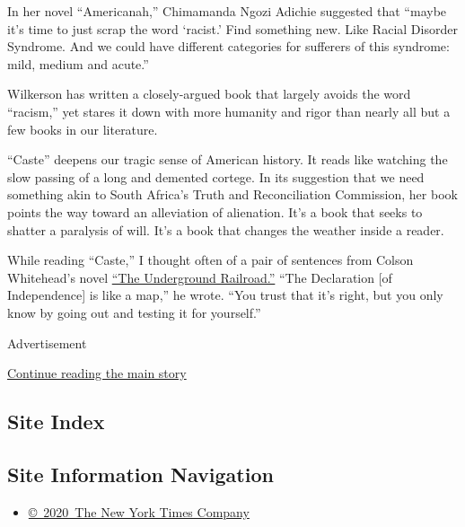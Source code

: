 In her novel ``Americanah,'' Chimamanda Ngozi Adichie suggested that
``maybe it's time to just scrap the word `racist.' Find something new.
Like Racial Disorder Syndrome. And we could have different categories
for sufferers of this syndrome: mild, medium and acute.''

Wilkerson has written a closely-argued book that largely avoids the word
``racism,'' yet stares it down with more humanity and rigor than nearly
all but a few books in our literature.

``Caste'' deepens our tragic sense of American history. It reads like
watching the slow passing of a long and demented cortege. In its
suggestion that we need something akin to South Africa's Truth and
Reconciliation Commission, her book points the way toward an alleviation
of alienation. It's a book that seeks to shatter a paralysis of will.
It's a book that changes the weather inside a reader.

While reading ``Caste,'' I thought often of a pair of sentences from
Colson Whitehead's novel
\href{https://www.nytimes3xbfgragh.onion/2016/08/03/books/review-the-underground-railroad-colson-whitehead.html}{``The
Underground Railroad.''} ``The Declaration {[}of Independence{]} is like
a map,'' he wrote. ``You trust that it's right, but you only know by
going out and testing it for yourself.''

Advertisement

\protect\hyperlink{after-bottom}{Continue reading the main story}

\hypertarget{site-index}{%
\subsection{Site Index}\label{site-index}}

\hypertarget{site-information-navigation}{%
\subsection{Site Information
Navigation}\label{site-information-navigation}}

\begin{itemize}
\tightlist
\item
  \href{https://help.nytimes3xbfgragh.onion/hc/en-us/articles/115014792127-Copyright-notice}{©~2020~The
  New York Times Company}
\end{itemize}

